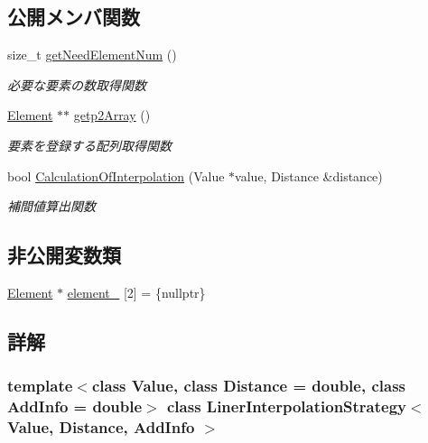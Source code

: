 \subsection*{公開メンバ関数}
\begin{DoxyCompactItemize}
\item 
size\+\_\+t \mbox{\hyperlink{class_liner_interpolation_strategy_ab0685e841d7054a8e040e0d2b9fabc68}{get\+Need\+Element\+Num}} ()
\begin{DoxyCompactList}\small\item\em 必要な要素の数取得関数 \end{DoxyCompactList}\item 
\mbox{\hyperlink{class_liner_interpolation_strategy_acbc8878179146c4a0f3ab0eb75c9d229}{Element}} $\ast$$\ast$ \mbox{\hyperlink{class_liner_interpolation_strategy_af8be5242260b3ea8670fd393a04af500}{getp2\+Array}} ()
\begin{DoxyCompactList}\small\item\em 要素を登録する配列取得関数 \end{DoxyCompactList}\item 
bool \mbox{\hyperlink{class_liner_interpolation_strategy_a2474fcce1fb2eed6f9bdd8c95582d2b2}{Calculation\+Of\+Interpolation}} (Value $\ast$value, Distance \&distance)
\begin{DoxyCompactList}\small\item\em 補間値算出関数 \end{DoxyCompactList}\end{DoxyCompactItemize}
\subsection*{非公開変数類}
\begin{DoxyCompactItemize}
\item 
\mbox{\hyperlink{class_liner_interpolation_strategy_acbc8878179146c4a0f3ab0eb75c9d229}{Element}} $\ast$ \mbox{\hyperlink{class_liner_interpolation_strategy_ab1ab6953cb454416981877e7ee8997fa}{element\+\_\+}} \mbox{[}2\mbox{]} = \{nullptr\}
\end{DoxyCompactItemize}


\subsection{詳解}
\subsubsection*{template$<$class Value, class Distance = double, class Add\+Info = double$>$\newline
class Liner\+Interpolation\+Strategy$<$ Value, Distance, Add\+Info $>$}

